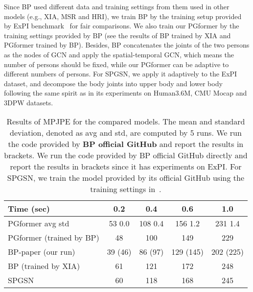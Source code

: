 \documentclass[10pt,twocolumn,letterpaper]{article}
\begin{document}
Since BP used different data and training settings from them used in other models (e.g., XIA, MSR and HRI), we train BP by the training setup provided by ExPI benchmark~\cite{guo2021multi} for fair comparisons. 
We also train our PGformer by the training settings provided by BP (see the results of BP trained by XIA and PGformer trained by BP). 
Besides, BP concatenates the joints of the two persons as the nodes of GCN and apply the spatial-temporal GCN, which means the number of persons should be fixed, while our PGformer can be adaptive to different numbers of persons. 
For SPGSN, we apply it adaptively to the ExPI dataset, and decompose the body joints into upper body and lower body following the same spirit as in its experiments on Human3.6M, CMU Mocap and 3DPW datasets. 

\begin{table}[ht]
    \setlength\tabcolsep{2.8pt}
    \caption{Results of MPJPE for the compared models. 
    The mean and standard deviation, denoted as avg and std, are computed by 5 runs. 
    We run the code provided by \textbf{BP official GitHub} and report the results in brackets.
    We run the code provided by BP official GitHub directly and report the results in brackets since it has experiments on ExPI. 
    For SPGSN, we train the model provided by its official GitHub using the training settings in~\cite{guo2021multi}.
    }
    \vskip -0.05in
    \label{tab:more_results}
    \begin{center}
    \footnotesize
\begin{tabular}{l|cccc}
\hline
        Time (sec) & 0.2 & 0.4 & 0.6 & 1.0 \\
        \hline
        PGformer avg  std & 53  0.0 & 108  0.4 & 156  1.2 & 231  1.4 \\
        PGformer (trained by BP) & 48 & 100 & 149 & 229 \\
        BP-paper (our run) & 39 (46) & 86 (97) & 129 (145) & 202 (225) \\
BP (trained by XIA) & 61 & 121 & 172 & 248 \\
        SPGSN & 60 & 118 & 168 & 245 \\ 
        \hline
    \end{tabular}
    \end{center}
    \vskip -0.2in
\end{table}
\end{document}
